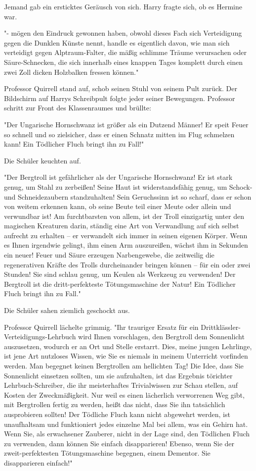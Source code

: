 {Jemand gab ein ersticktes Geräusch von sich. Harry fragte sich, ob es Hermine war.

"- mögen den Eindruck gewonnen haben, obwohl dieses Fach sich Verteidigung gegen die Dunklen Künste nennt, handle es eigentlich davon, wie man sich verteidigt gegen Alptraum-Falter, die mäßig schlimme Träume verursachen oder Säure-Schnecken, die sich innerhalb eines knappen Tages komplett durch einen zwei Zoll dicken Holzbalken fressen können."

Professor Quirrell stand auf, schob seinen Stuhl von seinem Pult zurück. Der Bildschirm auf Harrys Schreibpult folgte jeder seiner Bewegungen. Professor schritt zur Front des Klassenraumes und brüllte:

"Der Ungarische Hornschwanz ist größer als ein Dutzend Männer! Er speit Feuer so schnell und so zielsicher, dass er einen Schnatz mitten im Flug schmelzen kann! Ein Tödlicher Fluch bringt ihn zu Fall!"

Die Schüler keuchten auf.

"Der Bergtroll ist gefährlicher als der Ungarische Hornschwanz! Er ist stark genug, um Stahl zu zerbeißen! Seine Haut ist widerstandsfähig genug, um Schock- und Schneidezaubern standzuhalten! Sein Geruchssinn ist so scharf, dass er schon von weitem erkennen kann, ob seine Beute teil einer Meute oder allein und verwundbar ist! Am furchtbarsten von allem, ist der Troll einzigartig unter den magischen Kreaturen darin, ständig eine Art von Verwandlung auf sich selbst aufrecht zu erhalten -- er verwandelt sich immer in seinen eigenen Körper. Wenn es Ihnen irgendwie gelingt, ihm einen Arm auszureißen, wächst ihm in Sekunden ein neuer! Feuer und Säure erzeugen Narbengewebe, die zeitweilig die regenerativen Kräfte des Trolls durcheinander bringen können -- für ein oder zwei Stunden! Sie sind schlau genug, um Keulen als Werkzeug zu verwenden! Der Bergtroll ist die dritt-perfekteste Tötungsmaschine der Natur! Ein Tödlicher Fluch bringt ihn zu Fall."

Die Schüler sahen ziemlich geschockt aus.

Professor Quirrell lächelte grimmig. "Ihr trauriger Ersatz für ein Drittklässler-Verteidigungs-Lehrbuch wird Ihnen vorschlagen, den Bergtroll dem Sonnenlicht auszusetzen, wodurch er an Ort und Stelle erstarrt. Dies, meine jungen Lehrlinge, ist jene Art nutzloses Wissen, wie Sie es niemals in meinem Unterricht vorfinden werden. Man begegnet keinen Bergtrollen am hellichten Tag! Die Idee, dass Sie Sonnenlicht einsetzen sollten, um sie aufzuhalten, ist das Ergebnis törichter Lehrbuch-Schreiber, die ihr meisterhaftes Trivialwissen zur Schau stellen, auf Kosten der Zweckmäßigkeit. Nur weil es einen lächerlich verworrenen Weg gibt, mit Bergtrollen fertig zu werden, heißt das nicht, dass Sie ihn tatsächlich ausprobieren sollten! Der Tödliche Fluch kann nicht abgewehrt werden, ist unaufhaltsam und funktioniert jedes einzelne Mal bei allem, was ein Gehirn hat. Wenn Sie, als erwachsener Zauberer, nicht in der Lage sind, den Tödlichen Fluch zu verwenden, dann können Sie einfach disapparieren! Ebenso, wenn Sie der zweit-perfektesten Tötungsmaschine begegnen, einem Dementor. Sie disapparieren einfach!"

}
